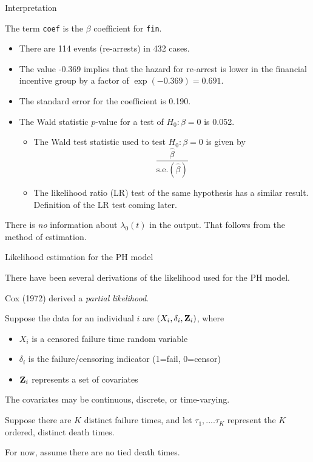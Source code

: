 \documentclass[ignorenonframetext,]{beamer}
\begin{document}
\begin{frame}{%
\protect\hypertarget{interpretation}{%
Interpretation}}

The term \texttt{coef} is the \(\beta\) coefficient for \texttt{fin}.

\begin{itemize}
\item
  There are 114 events (re-arrests) in 432 cases.
\item
  The value -0.369 implies that the hazard for re-arrest is lower in the
  financial incentive group by a factor of \(\exp(-0.369) = 0.691\).
\item
  The standard error for the coefficient is 0.190.
\item
  The Wald statistic \(p\)-value for a test of \(H_0: \beta = 0\) is
  0.052.

  \begin{itemize}
  \item
    The Wald test statistic used to test \(H_0: \beta = 0\) is given by
    \[\frac{\widehat{\beta}}{\text{s.e.}(\widehat{\beta})}\]
  \item
    The likelihood ratio (LR) test of the same hypothesis has a similar
    result. Definition of the LR test coming later.
  \end{itemize}
\end{itemize}

There is \emph{no} information about \(\lambda_0(t)\) in the output.
That follows from the method of estimation.

\end{frame}

\begin{frame}{%
\protect\hypertarget{likelihood-estimation-for-the-ph-model}{%
Likelihood estimation for the PH model}}

There have been several derivations of the likelihood used for the PH
model.

Cox (1972) derived a \emph{partial likelihood}.

Suppose the data for an individual \(i\) are
\((X_i, \delta_i, {\bf Z}_i)\), where

\begin{itemize}
\item
  \(X_i\) is a censored failure time random variable
\item
  \(\delta_i\) is the failure/censoring indicator (1=fail, 0=censor)
\item
  \({\bf Z}_i\) represents a set of covariates
\end{itemize}

The covariates may be continuous, discrete, or time-varying.

Suppose there are \(K\) distinct failure times, and let
\(\tau_1,....\tau_K\) represent the \(K\) ordered, distinct death times.

For now, assume there are no tied death times.

\end{frame}
\end{document}
